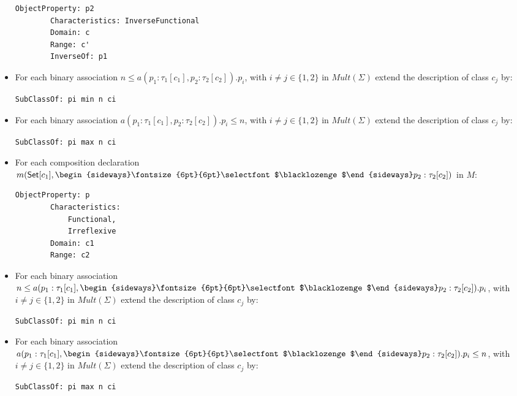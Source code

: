 \documentclass[10pt, a4paper]{isov2}
\newcommand{\composition}{\raisebox{0.2pt}{\begin{sideways}\fontsize{6pt}{6pt}\selectfont$\blacklozenge$\end{sideways}}}
\begin{document}
\begin{itemize}
\begin{lstlisting}[language=owl2Manchester]
	ObjectProperty: p2
		Characteristics: InverseFunctional
		Domain: c
		Range: c'
		InverseOf: p1
\end{lstlisting}
\item For each binary association $n \leq a(p_1:\tau_1[c_1],p_2:\tau_2[c_2]).p_i$, with $i \neq j\in\{1,2\}$ in $\mathit{Mult}(\Sigma)$ extend the description of class $c_j$ by:
\begin{lstlisting}[language=owl2Manchester]
	SubClassOf: pi min n ci
\end{lstlisting}
\item For each binary association $a(p_1:\tau_1[c_1],p_2:\tau_2[c_2]).p_i \leq n$, with $i \neq j\in\{1,2\}$  in $\mathit{Mult}(\Sigma)$ extend the description of class $c_j$ by:
\begin{lstlisting}[language=owl2Manchester]
	SubClassOf: pi max n ci
\end{lstlisting}
\item For each composition declaration $m(\mathsf{Set}[c_1], \composition p_2 :
\tau_2[c_2])$ in $M$:
\begin{lstlisting}[language=owl2Manchester]
	ObjectProperty: p
		Characteristics:
			Functional, 
			Irreflexive
		Domain: c1
		Range: c2
\end{lstlisting}
\item For each binary association $n \leq a(p_1:\tau_1[c_1], \composition p_2:\tau_2[c_2]).p_i$, with $i \neq j\in\{1,2\}$  in $\mathit{Mult}(\Sigma)$  extend the description of class $c_j$ by:
\begin{lstlisting}[language=owl2Manchester]
	SubClassOf: pi min n ci
\end{lstlisting}
\item For each binary association $a(p_1:\tau_1[c_1], \composition p_2:\tau_2[c_2]).p_i \leq n$, with $i \neq j\in\{1,2\}$  in $\mathit{Mult}(\Sigma)$ extend the description of class $c_j$ by:
\begin{lstlisting}[language=owl2Manchester]
	SubClassOf: pi max n ci
\end{lstlisting}
\end{itemize}
 

\label{sec:repr-trans}
\end{document}
